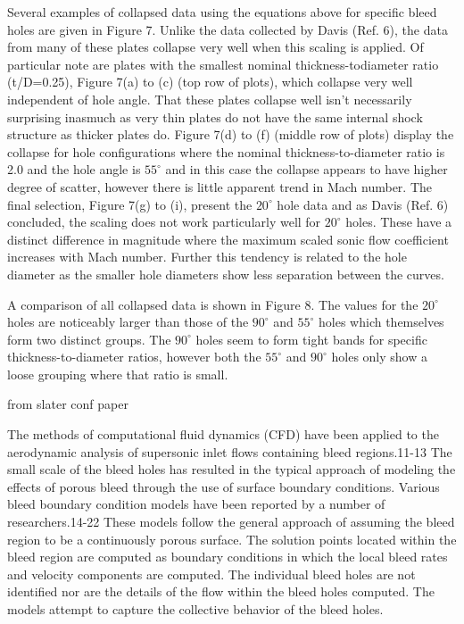 Several examples of collapsed data using the equations above for specific bleed holes are given in Figure 7. Unlike the data collected by Davis (Ref. 6), the data from many of these plates collapse very well when this scaling is applied. Of particular note are plates with the smallest nominal thickness-todiameter ratio (t/D=0.25), Figure 7(a) to (c) (top row of plots), which collapse very well independent of hole angle. That these plates collapse well isn’t necessarily surprising inasmuch as very thin plates do not have the same internal shock structure as thicker plates do. Figure 7(d) to (f) (middle row of plots) display the collapse for hole configurations where the nominal thickness-to-diameter ratio is 2.0 and the hole angle is $55^\circ$ and in this case the collapse appears to have higher degree of scatter, however there is little apparent trend in Mach number. The final selection, Figure 7(g) to (i), present the $20^\circ$ hole data and as Davis (Ref. 6) concluded, the scaling does not work particularly well for $20^\circ$ holes. These have a distinct difference in magnitude where the maximum scaled sonic flow coefficient increases with Mach number. Further this tendency is related to the hole diameter as the smaller hole diameters show less separation between the curves.

A comparison of all collapsed data is shown in Figure 8. The values for the $20^\circ$ holes are noticeably larger than those of the $90^\circ$ and $55^\circ$ holes which themselves form two distinct groups. The $90^\circ$ holes seem to form tight bands for specific thickness-to-diameter ratios, however both the $55^\circ$ and $90^\circ$ holes only show a loose grouping where that ratio is small.


from slater conf paper

The methods of computational fluid dynamics (CFD) have been applied to the aerodynamic analysis of supersonic inlet flows containing bleed regions.11-13 The small scale of the bleed holes has resulted in the typical approach of modeling the effects of porous bleed through the use of surface boundary conditions. Various bleed boundary condition models have been reported by a number of researchers.14-22 These models follow the general approach of assuming the bleed region to be a continuously porous surface. The solution points located within the bleed region are computed as boundary conditions in which the local bleed rates and velocity components are computed. The individual bleed holes are not identified nor are the details of the flow within the bleed holes computed. The models attempt to capture the collective behavior of the bleed holes.



